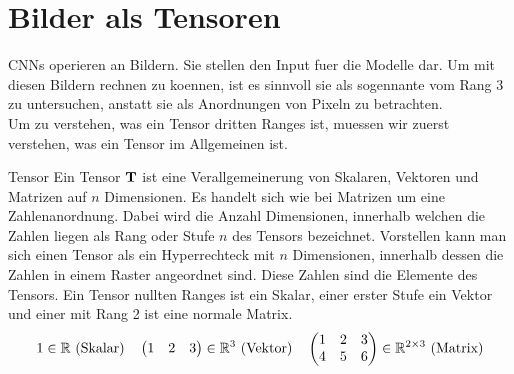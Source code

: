 \section{Bilder als Tensoren}\label{sec:tensor}
CNNs operieren an Bildern. Sie stellen den Input fuer die Modelle dar.
Um mit diesen Bildern rechnen zu koennen, ist es sinnvoll sie als sogennante
 vom Rang 3 zu untersuchen, anstatt sie als Anordnungen von
Pixeln zu betrachten. \\
Um zu verstehen, was ein Tensor dritten Ranges ist, muessen wir zuerst verstehen, was ein Tensor im Allgemeinen ist.

\begin{defbox}{Tensor}
  Ein Tensor $\mathbf{T}$ ist eine Verallgemeinerung von Skalaren, Vektoren und Matrizen auf
  $n$ Dimensionen. Es handelt sich wie bei Matrizen um
  eine Zahlenanordnung. Dabei wird die Anzahl Dimensionen, innerhalb welchen die
  Zahlen liegen als Rang oder Stufe $n$ des Tensors bezeichnet. Vorstellen kann man sich einen Tensor
  als ein Hyperrechteck mit $n$ Dimensionen, innerhalb dessen die Zahlen in
  einem Raster angeordnet sind. Diese Zahlen sind die Elemente des Tensors.
  Ein Tensor nullten Ranges ist ein Skalar, einer erster Stufe ein Vektor und
  einer mit Rang 2 ist eine normale Matrix.
  \begin{gather*}
    1 \in \mathbb{R} \text{ (Skalar)} \quad \begin{pmatrix} 1 & 2 & 3 \end{pmatrix}
    \in \mathbb{R}^3 \text{ (Vektor)} \quad
    \begin{pmatrix}
      1 & 2 & 3 \\
      4 & 5 & 6 \\
    \end{pmatrix} \in \mathbb{R}^{2 \times 3} \text{ (Matrix)}
  \end{gather*}
\end{defbox}


